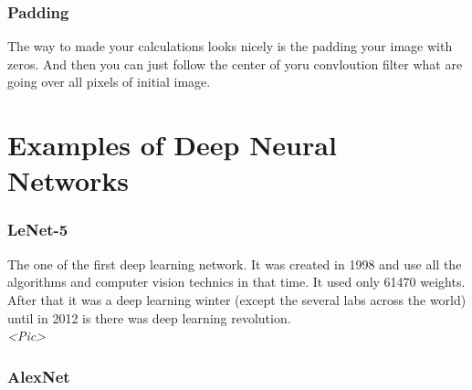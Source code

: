 \subsubsection*{Padding}

The way to made your calculations looks nicely is the padding your image with zeros. And then you can just follow the center of yoru convloution filter what are going over all pixels of initial image.

\section{Examples of Deep Neural Networks}
\vspace{-0.6cm}
\subsubsection*{LeNet-5}

The one of the first deep learning network. It was created in 1998 and use all the algorithms and computer vision technics in that time. It used only 61470 weights. After that it was a deep learning winter (except the several labs across the world) until in 2012 is there was deep learning revolution.\\
{\it <Pic>}

\subsubsection*{AlexNet}

